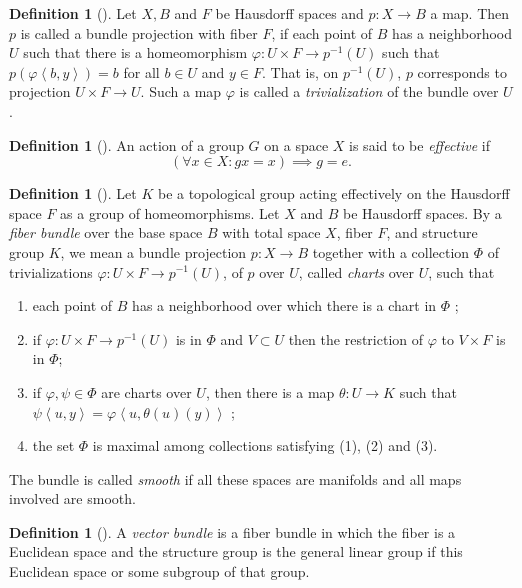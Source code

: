 \documentclass[reqno]{amsart}
\theoremstyle{definition}
\newtheorem{definition}[theorem]{Definition}
\theoremstyle{remark}
\begin{document}
\begin{definition}[]
    Let $X, B$ and $F$ be Hausdorff spaces and
    $p \colon X \to B$ a map.
    Then $p$ is called a bundle projection with
    fiber $F$, if each point of
    $B$ has a neighborhood $U$ such that there
    is a homeomorphism $\varphi \colon U \times F \to 
    p^{-1}(U) $ such that $p \left( \varphi
    \left<b,y  \right>\right) = b$ for all $b \in U$ and
    $y \in F$. That is, on  $p^{-1}(U)$, $p$ corresponds
    to projection $U \times F \to U$. Such a map
    $\varphi $ is called a \textit{trivialization} of the
    bundle over $U$.
\end{definition}

\begin{definition}[]
    An action of a group $G$ on a space $X$ is
    said to be \textit{effective} if
    \[
        \left( \forall x \in X \colon
        gx = x \right) \implies g = e.
    \] 
\end{definition}

\begin{definition}[]
    Let $K$ be a topological group acting effectively on
    the Hausdorff space $F$ as a group of homeomorphisms.
    Let $X$ and $B$ be Hausdorff spaces. By a 
    \textit{fiber bundle} over the base space $B$ with
    total space $X$, fiber $F$, and
    structure group $K$, we mean a bundle projection
    $p \colon X \to B$ together with a collection
    $\Phi $ of trivializations $\varphi \colon
    U \times F \to p^{-1}(U)$, of $p$ over $U$, called
    \textit{charts} over $U$, such that
    \begin{enumerate}
        \item each point of $B$ has a neighborhood
            over which there is a chart in $\Phi $ ;
        \item if $\varphi \colon U \times F \to 
            p^{-1}(U)$ is in $\Phi $ and
            $V \subset U$ then the restriction
            of $\varphi $ to $V \times F$ is in $\Phi$;
        \item if $\varphi, \psi \in \Phi$ are
            charts over $U$, then there is a map
            $\theta \colon U \to K$ such that
            $\psi \left<u,y \right> = 
            \varphi \left<u , \theta(u) (y) \right>$ ;
        \item the set $\Phi $ is maximal among
            collections satisfying (1), (2) and (3).
    \end{enumerate}

    The bundle is called \textit{smooth} if all these spaces
    are manifolds and all maps involved are smooth.
\end{definition}




\begin{definition}[]
    A \textit{vector bundle} is a fiber bundle
    in which the fiber is a Euclidean space
    and the structure group is the general linear group
    if this Euclidean space or some subgroup of that
    group.
\end{definition}








\newpage


\end{document}
